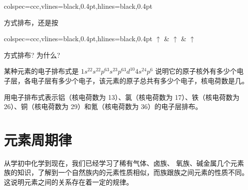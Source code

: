 \begin{Practice}[习题]
\begin{question}
\begin{tblr}[b]{colspec={ccc},vlines={black,0.4pt},hlines={black,0.4pt}}
    \end{tblr}
    方式排布，还是按
    \begin{tblr}[b]{colspec={ccc},vlines={black,0.4pt},hlines={black,0.4pt}}
      $\uparrow$ & $\uparrow$ & $\uparrow$ \\
    \end{tblr}
    方式排布? 为什么?
    \item 某种元素的电子排布式是 $1s^22s^22p^63s^23p^63d^{10}4s^24p^6$ 说明它的原子核外有多少个电子层，各电子层有多少个电子，该元素的原子总共有多少个电子，核电荷数是几。
    \item 用电子排布式表示铝（核电荷数为 13）、氯（核电荷数为 17）、铁（核电荷数为 26）、铜（核电荷数为 29）和氪（核电荷数为 36）的电子层排布。
  \end{question}
\end{Practice}

\section{元素周期律}
从学初中化学到现在，我们已经学习了稀有气体、卤族、 氧族、碱金属几个元素族的知识，了解到一个自然族内的元素性质相似，而族跟族之间元素的性质不同。
这说明元素之间的关系存在着一定的规律。

